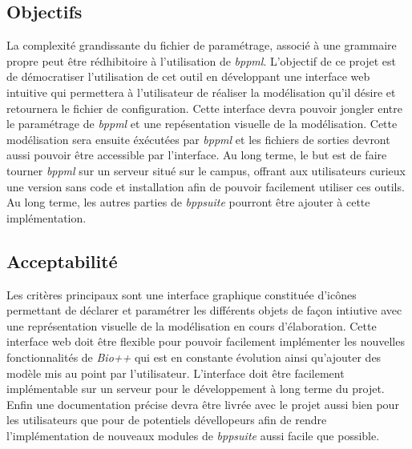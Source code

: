 	
\subsection{Objectifs}
	La complexité grandissante du fichier de paramétrage, associé à une grammaire propre peut être rédhibitoire à l'utilisation de \textit{bppml}. L'objectif de ce projet est de démocratiser l'utilisation de cet outil en développant une interface web intuitive qui permettera à l'utilisateur de réaliser la modélisation qu'il désire et retournera le fichier de configuration. Cette interface devra pouvoir jongler entre le paramétrage de \textit{bppml} et une repésentation visuelle de la modélisation. Cette modélisation sera ensuite éxécutées par \textit{bppml} et les fichiers de sorties devront aussi pouvoir être accessible par l'interface. Au long terme, le but est de faire tourner \textit{bppml} sur un serveur situé sur le campus, offrant aux utilisateurs curieux une version sans code et installation afin de pouvoir facilement utiliser ces outils. Au long terme, les autres parties de \textit{bppsuite} pourront être ajouter à cette implémentation.
	
\subsection{Acceptabilité}
	Les critères principaux sont une interface graphique constituée d'icônes permettant de déclarer et paramétrer les différents objets de façon intiutive avec une représentation visuelle de la modélisation en cours d'élaboration. Cette interface web doit être flexible pour pouvoir facilement implémenter les nouvelles fonctionnalités de \textit{Bio++} qui est en constante évolution ainsi qu'ajouter des modèle mis au point par l'utilisateur. L'interface doit être facilement implémentable sur un serveur pour le développement à long terme du projet.
Enfin une documentation précise devra être livrée avec le projet aussi bien pour les utilisateurs que pour de potentiels dévellopeurs
 afin de rendre l'implémentation de nouveaux modules de \textit{bppsuite} aussi facile que possible.
	
